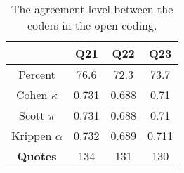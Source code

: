 \begin{table}[h]
\caption{The agreement level between the coders in the open
coding.}
\label{table: agreement level}
\centering
\begin{tabular}{cccc}
\hline
                & \textbf{Q21} & \textbf{Q22} & \textbf{Q23} \\ \hline
Percent         & 76.6         & 72.3         & 73.7         \\ \hline
Cohen   $\kappa$        & 0.731        & 0.688        & 0.71         \\ \hline
Scott  $\pi$         & 0.731        & 0.688        & 0.71         \\ \hline
Krippen  $\alpha$       & 0.732        & 0.689        & 0.711        \\ \hline
\textbf{Quotes} & 134          & 131          & 130          \\ \hline
\end{tabular}
\end{table}